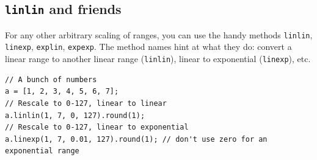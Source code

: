 \subsection{\texttt{linlin} and friends}

For any other arbitrary scaling of ranges, you can use the handy methods \texttt{linlin}, \texttt{linexp}, \texttt{explin}, \texttt{expexp}. The method names hint at what they do: convert a linear range to another linear range (\texttt{linlin}), linear to exponential (\texttt{linexp}), etc.

\begin{lstlisting}[style=SuperCollider-IDE, basicstyle=\scttfamily\footnotesize]
// A bunch of numbers
a = [1, 2, 3, 4, 5, 6, 7];
// Rescale to 0-127, linear to linear
a.linlin(1, 7, 0, 127).round(1);
// Rescale to 0-127, linear to exponential
a.linexp(1, 7, 0.01, 127).round(1); // don't use zero for an exponential range
\end{lstlisting}